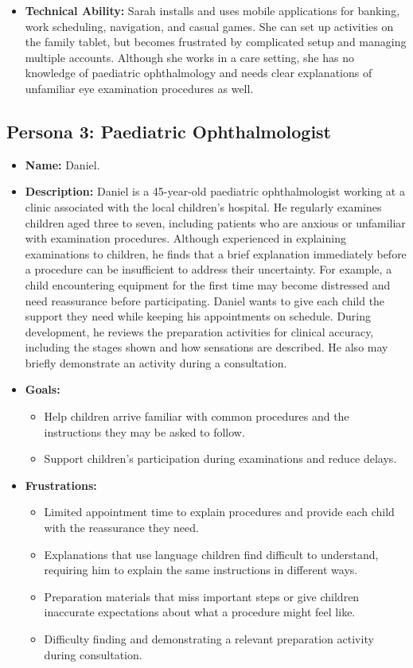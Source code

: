 \documentclass[12pt]{article}
\begin{document}
\begin{itemize}
\item \textbf{Technical Ability:} Sarah installs and uses
mobile applications for banking, work scheduling, navigation, and casual
games. She can set up activities on the family tablet, but becomes frustrated
by complicated setup and managing multiple accounts. Although she
works in a care setting, she has no knowledge of paediatric
ophthalmology and needs clear explanations of unfamiliar eye examination
procedures as well.
\end{itemize}

\subsection{Persona 3: Paediatric Ophthalmologist}
\begin{itemize}
\item \textbf{Name:} Daniel.

\item \textbf{Description:} Daniel is a 45-year-old paediatric ophthalmologist
working at a clinic associated with the local children's hospital. He
regularly examines children aged three to seven, including patients who are
anxious or unfamiliar with examination procedures. Although experienced
in explaining examinations to children, he finds that a brief explanation
immediately before a procedure can be insufficient to address their
uncertainty. For example, a child encountering equipment for the first time may
become distressed and need reassurance before participating. Daniel wants to give
each child the support they need while keeping his appointments on schedule.
During development, he reviews the preparation activities for clinical accuracy, including the
stages shown and how sensations are described. He also may briefly demonstrate an activity during a consultation.

\item \textbf{Goals:}
\begin{itemize}
    \item Help children arrive familiar with common procedures
    and the instructions they may be asked to follow.
    \item Support children's participation during examinations and reduce
    delays.
\end{itemize}

\item \textbf{Frustrations:}
\begin{itemize}
    \item Limited appointment time to explain procedures and
    provide each child with the reassurance they need.
    \item Explanations that use language children find difficult to understand,
    requiring him to explain the same instructions in different ways.
    \item Preparation materials that miss important steps or give children
    inaccurate expectations about what a procedure might feel like.
    \item Difficulty finding and demonstrating a relevant preparation
    activity during consultation.
\end{itemize}


\end{itemize}
\end{document}
